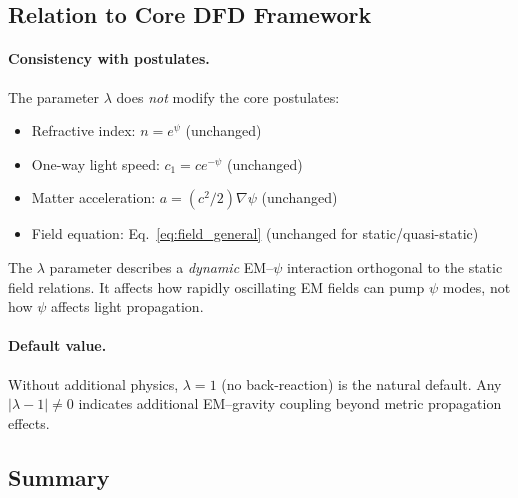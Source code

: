 \subsection{Relation to Core DFD Framework}\label{sec:lambda-relation}

\paragraph{Consistency with postulates.}
The parameter $\lambda$ does \textit{not} modify the core postulates:
\begin{itemize}
\item Refractive index: $n = e^\psi$ (unchanged)
\item One-way light speed: $c_1 = ce^{-\psi}$ (unchanged)
\item Matter acceleration: $a = (c^2/2)\nabla\psi$ (unchanged)
\item Field equation: Eq.~\eqref{eq:field_general} (unchanged for static/quasi-static)
\end{itemize}

The $\lambda$ parameter describes a \textit{dynamic} EM--$\psi$ interaction 
orthogonal to the static field relations. It affects how rapidly oscillating 
EM fields can pump $\psi$ modes, not how $\psi$ affects light propagation.

\paragraph{Default value.}
Without additional physics, $\lambda = 1$ (no back-reaction) is the natural 
default. Any $|\lambda - 1| \neq 0$ indicates additional EM--gravity coupling 
beyond metric propagation effects.

\subsection{Summary}\label{sec:lambda-summary}

